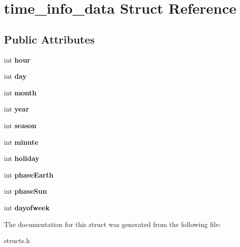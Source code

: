 \hypertarget{structtime__info__data}{\section{time\-\_\-info\-\_\-data Struct Reference}
\label{structtime__info__data}
}
\subsection*{Public Attributes}
\begin{DoxyCompactItemize}
\item 
\hypertarget{structtime__info__data_a0fcbcda81b3ab0a49d32a41744b137d9}{int {\bfseries hour}}\label{structtime__info__data_a0fcbcda81b3ab0a49d32a41744b137d9}

\item 
\hypertarget{structtime__info__data_a1f01632ffda7d65eac96af317c583314}{int {\bfseries day}}\label{structtime__info__data_a1f01632ffda7d65eac96af317c583314}

\item 
\hypertarget{structtime__info__data_a22108b21961f4f9cec8b54a4b4c4d84d}{int {\bfseries month}}\label{structtime__info__data_a22108b21961f4f9cec8b54a4b4c4d84d}

\item 
\hypertarget{structtime__info__data_a9b23c77bd71d154d663750877835b09a}{int {\bfseries year}}\label{structtime__info__data_a9b23c77bd71d154d663750877835b09a}

\item 
\hypertarget{structtime__info__data_ac33501726de03bc8755d9c478703fe45}{int {\bfseries season}}\label{structtime__info__data_ac33501726de03bc8755d9c478703fe45}

\item 
\hypertarget{structtime__info__data_a75276c6362e781fd5aa91b633a6b8213}{int {\bfseries minute}}\label{structtime__info__data_a75276c6362e781fd5aa91b633a6b8213}

\item 
\hypertarget{structtime__info__data_a95146b927318947189e5b300e1e06ef2}{int {\bfseries holiday}}\label{structtime__info__data_a95146b927318947189e5b300e1e06ef2}

\item 
\hypertarget{structtime__info__data_a9e6037ad4b7b0653cad792c1118b79fb}{int {\bfseries phase\-Earth}}\label{structtime__info__data_a9e6037ad4b7b0653cad792c1118b79fb}

\item 
\hypertarget{structtime__info__data_aa37cbf721a84db88ea4f3483395360fa}{int {\bfseries phase\-Sun}}\label{structtime__info__data_aa37cbf721a84db88ea4f3483395360fa}

\item 
\hypertarget{structtime__info__data_a25eb1efed1e6fa7b81bca031a9d747cd}{int {\bfseries dayofweek}}\label{structtime__info__data_a25eb1efed1e6fa7b81bca031a9d747cd}

\end{DoxyCompactItemize}


The documentation for this struct was generated from the following file\-:\begin{DoxyCompactItemize}
\item 
structs.\-h\end{DoxyCompactItemize}
